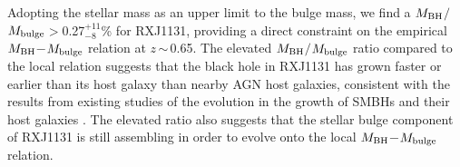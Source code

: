 \documentclass[]{emulateapj}
\newcommand{\mbulge}{\mbox{$M_{\rm bulge}$}\xspace}
\newcommand{\petm}[2]{$^{+#1}_{-#2}$}
\newcommand{\ssim}{\,$\sim$\,}
\begin{document}
Adopting the stellar mass as an upper limit to the bulge mass, we find a
$M_{\rm BH}$$/$$M_{\rm bulge}$$>$0.27\petm{11}{8}\% for RXJ1131, providing
a direct constraint on the empirical $M_{\rm BH}$$-$\mbulge relation at $z$\ssim0.65.
The elevated $M_{\rm BH}$$/$$M_{\rm bulge}$ ratio compared to the local relation suggests that the
black hole in RXJ1131 has grown faster or earlier than its host galaxy than nearby AGN host galaxies,
consistent with the results from existing studies of the evolution in the growth of SMBHs and their host galaxies
\citep[e.g.,][]{Walter04a, Peng06a,McLure06a}.
The elevated ratio also suggests that the stellar bulge component of RXJ1131 is still assembling in order to evolve onto the local  $M_{\rm BH}$$-$$M_{\rm bulge}$ relation.



\acknowledgments
\end{document}
